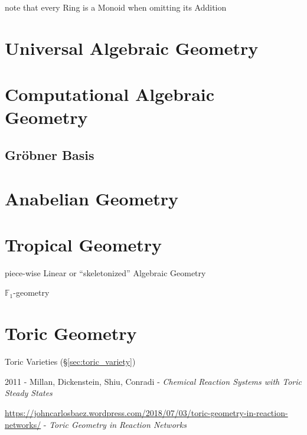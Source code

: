 note that every Ring is a Monoid when omitting its Addition



\section{Universal Algebraic Geometry}\label{sec:universal_geometry}

\section{Computational Algebraic Geometry}
\label{sec:computational_algebraic_geometry}

\subsection{Gr\"obner Basis}\label{sec:grobner_basis}\hfill




\section{Anabelian Geometry}\label{sec:anabelian_geometry}

\section{Tropical Geometry}\label{sec:tropical_geometry}

piece-wise Linear or ``skeletonized'' Algebraic Geometry

\fist $\mathbb{F}_1$-geometry



\section{Toric Geometry}\label{sec:toric_geometry}

Toric Varieties (\S\ref{sec:toric_variety})

2011 - Millan, Dickenstein, Shiu, Conradi - \emph{Chemical Reaction Systems with
  Toric Steady States}

\url{https://johncarlosbaez.wordpress.com/2018/07/03/toric-geometry-in-reaction-networks/}
- \emph{Toric Geometry in Reaction Networks}
